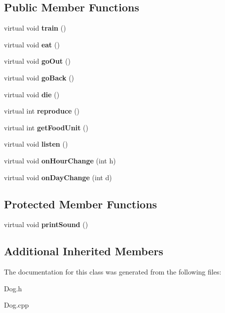 \subsection*{Public Member Functions}
\begin{DoxyCompactItemize}
\item 
\mbox{\label{class_dog_aa3ac6ad4799963f3084b347cba19594e}} 
virtual void {\bfseries train} ()
\item 
\mbox{\label{class_dog_a03adeca9cd440ef988f9a07a41cc2f18}} 
virtual void {\bfseries eat} ()
\item 
\mbox{\label{class_dog_a32bc56294e6514c52d68b3e6ceb90768}} 
virtual void {\bfseries go\+Out} ()
\item 
\mbox{\label{class_dog_a41d697efa2242f02bd9a21605407f658}} 
virtual void {\bfseries go\+Back} ()
\item 
\mbox{\label{class_dog_a2d87cfdfd256fe56b0b83249dc11bdae}} 
virtual void {\bfseries die} ()
\item 
\mbox{\label{class_dog_a3b8fdd98742fea3b9e438538126edf6d}} 
virtual int {\bfseries reproduce} ()
\item 
\mbox{\label{class_dog_a8e0822b32600da1b3c792bfddcf976b6}} 
virtual int {\bfseries get\+Food\+Unit} ()
\item 
\mbox{\label{class_dog_a6becf925701be98c59817d2a6697129c}} 
virtual void {\bfseries listen} ()
\item 
\mbox{\label{class_dog_a4820ede4339708ac557d05f70518e08b}} 
virtual void {\bfseries on\+Hour\+Change} (int h)
\item 
\mbox{\label{class_dog_a03fdea43325495ca60f1aad753b0fc6a}} 
virtual void {\bfseries on\+Day\+Change} (int d)
\end{DoxyCompactItemize}
\subsection*{Protected Member Functions}
\begin{DoxyCompactItemize}
\item 
\mbox{\label{class_dog_a042e0f6390025ea229fdba51a60c2ca7}} 
virtual void {\bfseries print\+Sound} ()
\end{DoxyCompactItemize}
\subsection*{Additional Inherited Members}


The documentation for this class was generated from the following files\+:\begin{DoxyCompactItemize}
\item 
Dog.\+h\item 
Dog.\+cpp\end{DoxyCompactItemize}
